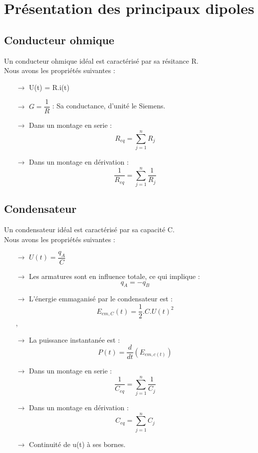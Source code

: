 \chapter{Présentation des principaux dipoles}
\section{Conducteur ohmique}
Un conducteur ohmique idéal est caractérisé par sa résitance R.\\
Nous avons les propriétés suivantes :\\
\begin{itemize}
 \item[$\rightarrow$] U(t) = R.i(t) \\
 \item[$\rightarrow$] $G = \dfrac{1}{R}$ : Sa conductance, d'unité le Siemens.\\
 \item[$\rightarrow$] Dans un montage en serie : $$R_{eq} = \sum_{j=1}^n R_j$$
 \item[$\rightarrow$] Dans un montage en dérivation : $$\dfrac{1}{R_{eq}} = \sum_{j=1}^n \dfrac{1}{R_j}$$
\end{itemize}
\section{Condensateur}
Un condensateur idéal est caractérisé par sa capacité C.\\
Nous avons les propriétés suivantes :\\
\begin{itemize}
 \item[$\rightarrow$] $U(t) = \dfrac{q_A}{C}$ \\
 \item[$\rightarrow$] Les armatures sont en influence totale, ce qui implique : $$q_A = -q_B$$
 \item[$\rightarrow$] L'énergie emmaganisé par le condensateur est : $$E_{em,C}(t) = \dfrac{1}{2}.C.U(t)^2$$
,\item[$\rightarrow$] La puissance instantanée est : $$P(t) = \dfrac{d}{dt}(E_{em,c(t)})$$
 \item[$\rightarrow$] Dans un montage en serie : $$\dfrac{1}{C_{eq}} = \sum_{j=1}^n \dfrac{1}{C_j}$$
 \item[$\rightarrow$] Dans un montage en dérivation : $$C_{eq} = \sum_{j=1}^n C_j$$
 \item[$\rightarrow$] Continuité de u(t) à ses bornes.
\end{itemize}
